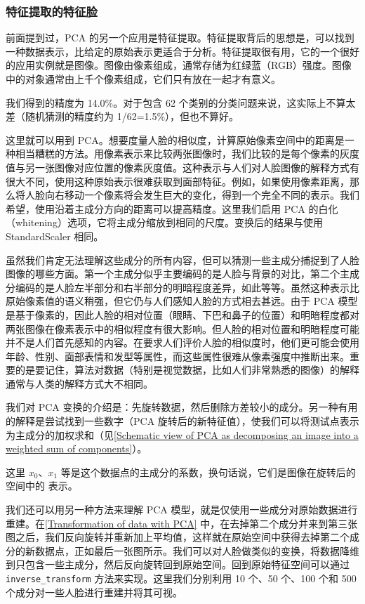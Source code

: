 \subsubsection{特征提取的特征脸}
前面提到过，PCA 的另一个应用是特征提取。特征提取背后的思想是，可以找到一种数据表示，比给定的原始表示更适合于分析。特征提取很有用，它的一个很好的应用实例就是图像。图像由像素组成，通常存储为红绿蓝（RGB）强度。图像中的对象通常由上千个像素组成，它们只有放在一起才有意义。

我们得到的精度为 14.0\%。对于包含 62 个类别的分类问题来说，这实际上不算太差（随机猜测的精度约为 1/62=1.5\%），但也不算好。

这里就可以用到 PCA。想要度量人脸的相似度，计算原始像素空间中的距离是一种相当糟糕的方法。用像素表示来比较两张图像时，我们比较的是每个像素的灰度值与另一张图像对应位置的像素灰度值。这种表示与人们对人脸图像的解释方式有很大不同，使用这种原始表示很难获取到面部特征。例如，如果使用像素距离，那么将人脸向右移动一个像素将会发生巨大的变化，得到一个完全不同的表示。我们希望，使用沿着主成分方向的距离可以提高精度。这里我们启用 PCA 的白化（whitening）选项，它将主成分缩放到相同的尺度。变换后的结果与使用 StandardScaler 相同。

虽然我们肯定无法理解这些成分的所有内容，但可以猜测一些主成分捕捉到了人脸图像的哪些方面。第一个主成分似乎主要编码的是人脸与背景的对比，第二个主成分编码的是人脸左半部分和右半部分的明暗程度差异，如此等等。虽然这种表示比原始像素值的语义稍强，但它仍与人们感知人脸的方式相去甚远。由于 PCA 模型是基于像素的，因此人脸的相对位置（眼睛、下巴和鼻子的位置）和明暗程度都对两张图像在像素表示中的相似程度有很大影响。但人脸的相对位置和明暗程度可能并不是人们首先感知的内容。在要求人们评价人脸的相似度时，他们更可能会使用年龄、性别、面部表情和发型等属性，而这些属性很难从像素强度中推断出来。重要的是要记住，算法对数据（特别是视觉数据，比如人们非常熟悉的图像）的解释通常与人类的解释方式大不相同。

我们对 PCA 变换的介绍是：先旋转数据，然后删除方差较小的成分。另一种有用的解释是尝试找到一些数字（PCA 旋转后的新特征值），使我们可以将测试点表示为主成分的加权求和（见\autoref{Schematic view of PCA as decomposing an image into a weighted sum of components}）。


这里 $x_0$、$x_1$ 等是这个数据点的主成分的系数，换句话说，它们是图像在旋转后的空间中的
表示。

我们还可以用另一种方法来理解 PCA 模型，就是仅使用一些成分对原始数据进行重建。在\autoref{Transformation of data with PCA} 中，在去掉第二个成分并来到第三张图之后，我们反向旋转并重新加上平均值，这样就在原始空间中获得去掉第二个成分的新数据点，正如最后一张图所示。我们可以对人脸做类似的变换，将数据降维到只包含一些主成分，然后反向旋转回到原始空间。回到原始特征空间可以通过 \verb|inverse_transform| 方法来实现。这里我们分别利用 10 个、50 个、100 个和 500 个成分对一些人脸进行重建并将其可视。


